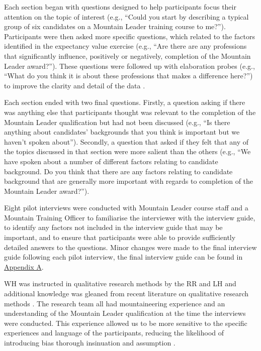 \documentclass[
  12pt,
  a4paper,
]{book}
\begin{document}
Each section began with questions designed to help participants focus their attention on the topic of interest (e.g., ``Could you start by describing a typical group of six candidates on a Mountain Leader training course to me?''). Participants were then asked more specific questions, which related to the factors identified in the expectancy value exercise (e.g., ``Are there are any professions that significantly influence, positively or negatively, completion of the Mountain Leader award?''). These questions were followed up with elaboration probes (e.g., ``What do you think it is about these professions that makes a difference here?'') to improve the clarity and detail of the data \citep{Patton2002}.

Each section ended with two final questions. Firstly, a question asking if there was anything else that participants thought was relevant to the completion of the Mountain Leader qualification but had not been discussed (e.g., ``Is there anything about candidates' backgrounds that you think is important but we haven't spoken about''). Secondly, a question that asked if they felt that any of the topics discussed in that section were more salient than the others (e.g., ``We have spoken about a number of different factors relating to candidate background. Do you think that there are any factors relating to candidate background that are generally more important with regards to completion of the Mountain Leader award?'').

Eight pilot interviews were conducted with Mountain Leader course staff and a Mountain Training Officer to familiarise the interviewer with the interview guide, to identify any factors not included in the interview guide that may be important, and to ensure that participants were able to provide sufficiently detailed answers to the questions. Minor changes were made to the final interview guide following each pilot interview, the final interview guide can be found in \protect\hyperlink{appendix-interview-guide}{Appendix A}.

WH was instructed in qualitative research methods by the RR and LH and additional knowledge was gleaned from recent literature on qualitative research methods \citep[e.g.,][]{Smith2018a}. The research team all had mountaineering experience and an understanding of the Mountain Leader qualification at the time the interviews were conducted. This experience allowed us to be more sensitive to the specific experiences and language of the participants, reducing the likelihood of introducing bias thorough insinuation and assumption \citep{Denzin2005}.
\end{document}
